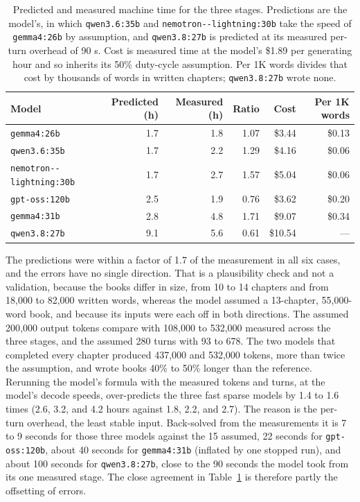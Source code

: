 \documentclass[11pt]{article}
\newcommand{\mdl}[1]{\texttt{#1}}
\newcommand{\Qeight}{\mdl{qwen3.8:27b}}
\newcommand{\Gthirtyone}{\mdl{gemma4:31b}}
\newcommand{\Qsix}{\mdl{qwen3.6:35b}}
\newcommand{\Gtwentysix}{\mdl{gemma4:26b}}
\newcommand{\Nemo}{\mdl{nemotron-\allowbreak 3.5-\allowbreak lightning:30b}}
\newcommand{\Gptoss}{\mdl{gpt-oss:120b}}
\begin{document}
\begin{table}[htbp]
\centering
\small
\begin{tabular}{@{}lrrrrr@{}}
\toprule
\textbf{Model} & \textbf{Predicted (h)} & \textbf{Measured (h)} & \textbf{Ratio} & \textbf{Cost} & \textbf{Per 1K words} \\
\midrule
\Gtwentysix & 1.7 & 1.8 & 1.07 & \$3.44 & \$0.13 \\
\Qsix & 1.7 & 2.2 & 1.29 & \$4.16 & \$0.06 \\
\Nemo & 1.7 & 2.7 & 1.57 & \$5.04 & \$0.06 \\
\Gptoss & 2.5 & 1.9 & 0.76 & \$3.62 & \$0.20 \\
\Gthirtyone & 2.8 & 4.8 & 1.71 & \$9.07 & \$0.34 \\
\Qeight & 9.1 & 5.6 & 0.61 & \$10.54 & --- \\
\bottomrule
\end{tabular}
\caption{Predicted and measured machine time for the three stages. Predictions are the model's, in which \Qsix{} and \Nemo{} take the speed of \Gtwentysix{} by assumption, and \Qeight{} is predicted at its measured per-turn overhead of 90 s. Cost is measured time at the model's \$1.89 per generating hour and so inherits its 50\% duty-cycle assumption. Per 1K words divides that cost by thousands of words in written chapters; \Qeight{} wrote none.}
\label{tab:costcompare}
\end{table}

The predictions were within a factor of 1.7 of the measurement in all six cases, and the errors have no single direction. That is a plausibility check and not a validation, because the books differ in size, from 10 to 14 chapters and from 18,000 to 82,000 written words, whereas the model assumed a 13-chapter, 55,000-word book, and because its inputs were each off in both directions. The assumed 200,000 output tokens compare with 108,000 to 532,000 measured across the three stages, and the assumed 280 turns with 93 to 678. The two models that completed every chapter produced 437,000 and 532,000 tokens, more than twice the assumption, and wrote books 40\% to 50\% longer than the reference. Rerunning the model's formula with the measured tokens and turns, at the model's decode speeds, over-predicts the three fast sparse models by 1.4 to 1.6 times (2.6, 3.2, and 4.2 hours against 1.8, 2.2, and 2.7). The reason is the per-turn overhead, the least stable input. Back-solved from the measurements it is 7 to 9 seconds for those three models against the 15 assumed, 22 seconds for \Gptoss, about 40 seconds for \Gthirtyone{} (inflated by one stopped run), and about 100 seconds for \Qeight, close to the 90 seconds the model took from its one measured stage. The close agreement in Table~\ref{tab:costcompare} is therefore partly the offsetting of errors.
\end{document}
